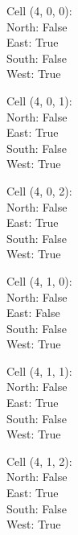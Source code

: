 \documentclass{article}
\begin{document}
\begin{multicols*}{3}
Cell (4, 0, 0):\\
\-\hspace{2cm}North: False\\
\-\hspace{2cm}East: True\\
\-\hspace{2cm}South: False\\
\-\hspace{2cm}West: True

Cell (4, 0, 1):\\
\-\hspace{2cm}North: False\\
\-\hspace{2cm}East: True\\
\-\hspace{2cm}South: False\\
\-\hspace{2cm}West: True

Cell (4, 0, 2):\\
\-\hspace{2cm}North: False\\
\-\hspace{2cm}East: True\\
\-\hspace{2cm}South: False\\
\-\hspace{2cm}West: True

Cell (4, 1, 0):\\
\-\hspace{2cm}North: False\\
\-\hspace{2cm}East: False\\
\-\hspace{2cm}South: False\\
\-\hspace{2cm}West: True

Cell (4, 1, 1):\\
\-\hspace{2cm}North: False\\
\-\hspace{2cm}East: True\\
\-\hspace{2cm}South: False\\
\-\hspace{2cm}West: True

Cell (4, 1, 2):\\
\-\hspace{2cm}North: False\\
\-\hspace{2cm}East: True\\
\-\hspace{2cm}South: False\\
\-\hspace{2cm}West: True


\end{multicols*}
\end{document}
